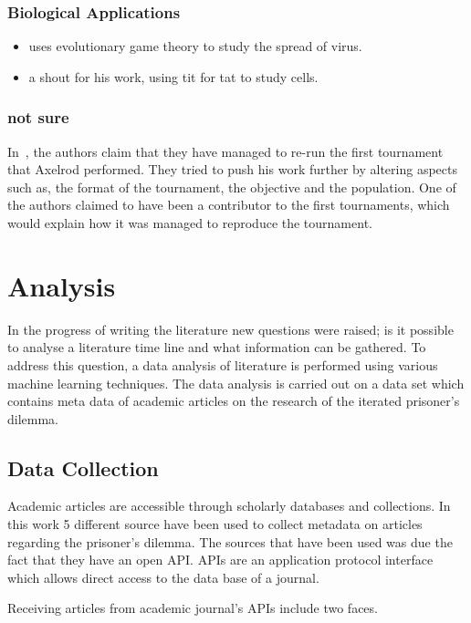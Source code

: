 \documentclass{article}
\begin{document}
\subsubsection{Biological Applications}
\begin{itemize}
    \item \cite{Turner1999} uses evolutionary game theory to study the spread of
    virus.
    \item \cite{Douglas2011} a shout for his work, using tit for tat to study cells.
\end{itemize}
\subsubsection{not sure}
In~\cite{Rapoport2015}, the authors claim that they have managed to 
re-run the first tournament that Axelrod performed. They tried to push his work
further by altering aspects such as, the format of the tournament, the objective
and the population. One of the authors claimed to have been a contributor
to the first tournaments, which would explain how it was managed to reproduce
the tournament.

\section{Analysis}\label{section:analysis}

In the progress of writing the literature new questions were raised; is it 
possible to analyse a literature time line and what information can be gathered. 
To address this question, a data analysis of literature is performed using various
machine learning techniques. The data analysis is carried out on a data set which
contains meta data of academic articles on the research of the iterated prisoner's 
dilemma.

\subsection{Data Collection}

Academic articles are accessible through scholarly databases and collections.
In this work 5 different source have been used to collect metadata on articles 
regarding the prisoner's dilemma. The sources that have been used was due the fact
that they have an open API. APIs are an application protocol interface which 
allows direct access to the data base of a journal. 

Receiving articles from academic journal's APIs include two faces. 
\end{document}
